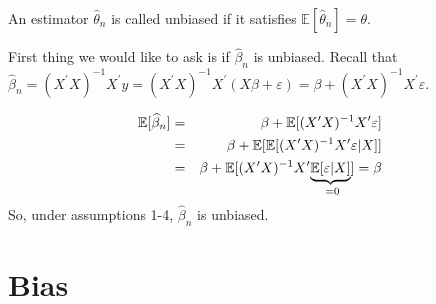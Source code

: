 \documentclass[notes=show]{beamer}
\begin{document}
\begin{frame}%


\begin{definition}
An estimator $\hat{\theta}_{n}$ is called unbiased if it satisfies $\mathbb{E%
}[\widehat{\theta }_{n}]=\theta .$
\end{definition}

First thing we would like to ask is if $\widehat{\beta }_{n}$ is unbiased.
Recall that $\widehat{\beta }_{n}=(X^{\prime }X)^{-1}X^{\prime }y=(X^{\prime
}X)^{-1}X^{\prime }(X\beta +\varepsilon )=\beta +(X^{\prime
}X)^{-1}X^{\prime }\varepsilon .$

\begin{eqnarray*}
\mathbb{E}[\widehat{\beta }_{n}] &=&\beta +\mathbb{E}[(X^{\prime
}X)^{-1}X^{\prime }\varepsilon ] \\
&=&\beta +\mathbb{E[E[}(X^{\prime }X)^{-1}X^{\prime }\varepsilon |X]] \\
&=&\beta +\mathbb{E[}(X^{\prime }X)^{-1}X^{\prime }\underset{=0}{\underbrace{%
\mathbb{E[}\varepsilon |X]}]}=\beta
\end{eqnarray*}%
So, under assumptions 1-4, $\widehat{\beta }_{n}$ is unbiased.

\end{frame}%

\section{Bias}
\end{document}
